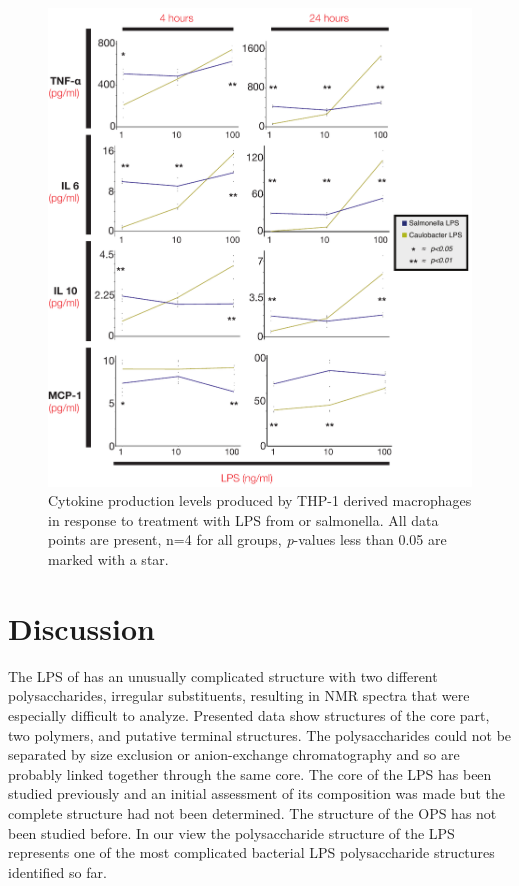 \begin{figure}[p]
  \begin{center}
   \includegraphics[width=\textwidth]{lps_chapter/img/cytokineprofile.pdf}
  \end{center}
  \caption[Cytokine profile comparing \acl{caulobacter} and \acl{salmonella} \ac{LPS}]{
    Cytokine production levels produced by THP-1 derived macrophages in response to treatment with \ac{LPS} from \caulobacter{} or \ac{salmonella}.  All data points are present, n=4 for all groups, \textit{p}-values less than 0.05 are marked with a star.
  }
  \label{fig:cytokineprofile}
\end{figure}    

\section{Discussion} %
\label{sec:lps_discussion}

The \ac{LPS} of \caulobacter has an unusually complicated structure with two different
polysaccharides, irregular substituents, resulting in \ac{NMR} spectra that were especially difficult to analyze. Presented data show
structures of the core part, two polymers, and putative terminal structures. The polysaccharides
could not be separated by size exclusion or anion-exchange chromatography and so are probably linked
together through the same core. The core of the \caulobacter{} \ac{LPS} has been studied previously
and an initial assessment of its composition was made but the complete
structure had not been determined. The structure of the \ac{OPS} has not been studied before. In our
view the polysaccharide structure of the \caulobacter{} \ac{LPS} represents one of the most
complicated bacterial \ac{LPS} polysaccharide structures identified so far.

